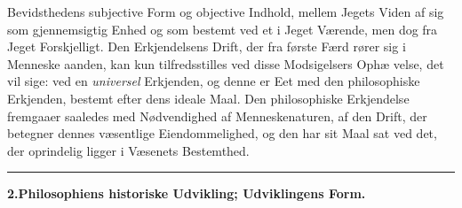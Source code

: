 \documentclass[12pt,a4paper]{book}
\newcommand{\divrule}{\begin{center}\rule{2cm}{0.4pt}\end{center}}
\begin{document}
Bevidsthedens subjective Form og objective Indhold, mellem
Jegets Viden af sig som gjennemsigtig Enhed og som bestemt
ved et i Jeget Værende, men dog fra Jeget Forskjelligt. Den
Erkjendelsens Drift, der fra første Færd rører sig i Menneske\-%
aanden, kan kun tilfredsstilles ved disse Modsigelsers Ophæ\-%
velse, det vil sige: ved en \emph{universel} Erkjenden, og denne er
Eet med den philosophiske Erkjenden, bestemt efter dens ideale
Maal. Den philosophiske Erkjendelse fremgaaer saaledes med
Nødvendighed af Menneskenaturen, af den Drift, der betegner
dennes væsentlige Eiendommelighed, og den har sit Maal sat
ved det, der oprindelig ligger i Væsenets Bestemthed.
\divrule
\begin{center}
\textbf{2.\enspace Philosophiens historiske Udvikling; Udviklingens Form.}
\end{center}
\end{document}
